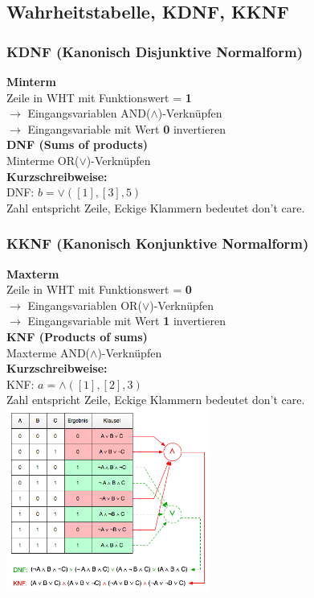 \subsection{Wahrheitstabelle, KDNF, KKNF}
\begin{multicols}{2}
\subsubsection{KDNF (Kanonisch  Disjunktive Normalform)}
\vspace{-5pt}
\textbf{Minterm}$~~$ \\
Zeile in WHT mit Funktionswert = \textbf{1}\\
$\rightarrow$ Eingangsvariablen AND($\land$)-Verknüpfen \\
$\rightarrow $ Eingangsvariable mit Wert \textbf{0} invertieren\\
\textbf{DNF (Sums of products)}\\
Minterme OR($\lor$)-Verknüpfen\\
\textbf{Kurzschreibweise:}\\
DNF: $ b = \lor([1],[3],5) $ \\
Zahl entspricht Zeile, Eckige Klammern bedeutet don't care.\\ 

\subsubsection{KKNF (Kanonisch Konjunktive Normalform)}
\vspace{-5pt}
\textbf{Maxterm}$~~$ \\
Zeile in WHT mit Funktionswert = \textbf{0}\\
$\rightarrow$ Eingangsvariablen OR($\lor$)-Verknüpfen \\
$\rightarrow $ Eingangsvariable mit Wert \textbf{1} invertieren\\
\textbf{KNF (Products of sums)}\\
Maxterme AND($\land$)-Verknüpfen\\
\textbf{Kurzschreibweise:}\\
KNF: $ a = \land([1],[2],3) $ \\
Zahl entspricht Zeile, Eckige Klammern bedeutet don't care.\\ 

\includegraphics[width=0.5\textwidth]{pics/KNFDNF}
\end{multicols}

